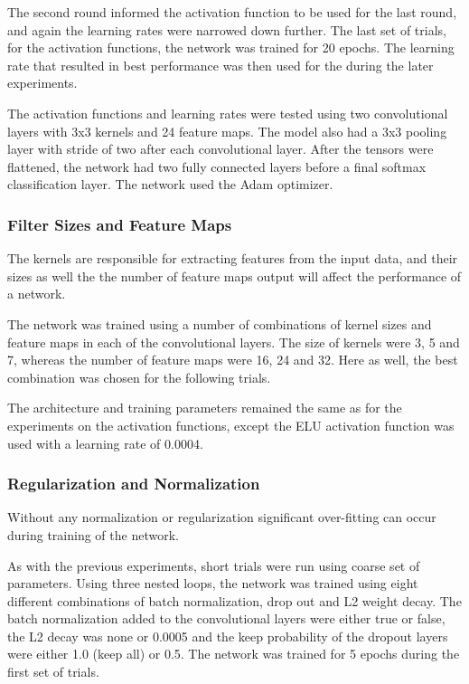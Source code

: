 \documentclass[]{article}
\begin{document}
The second round informed the activation function to be used for the last round, and again the learning rates were narrowed down further. The last set of trials, for the activation functions, the network was trained for 20 epochs. The learning rate that resulted in best performance was then used for the during the later experiments. 

The activation functions and learning rates were tested using two convolutional layers with 3x3 kernels and 24 feature maps. The model also had a 3x3 pooling layer with stride of two after each convolutional layer. After the tensors were flattened, the network had two fully connected layers before a final softmax classification layer. The network used the Adam optimizer. 

\subsubsection{Filter Sizes and Feature Maps}

The kernels are responsible for extracting features from the input data, and their sizes as well the the number of feature maps output will affect the performance of a network. 

The network was trained using a number of combinations of kernel sizes and feature maps in each of the convolutional layers. The size of kernels were 3, 5 and 7, whereas the number of feature maps were 16, 24 and 32. Here as well, the best combination was chosen for the following trials.

The architecture and training parameters remained the same as for the experiments on the activation functions, except the ELU activation function was used with a learning rate of 0.0004. 

\subsubsection{Regularization and Normalization}

Without any normalization or regularization significant over-fitting can occur during training of the network. 

As with the previous experiments, short trials were run using coarse set of parameters. Using three nested loops, the network was trained using eight different combinations of batch normalization, drop out and L2 weight decay. The batch normalization added to the convolutional layers were either true or false, the L2 decay was none or 0.0005 and the keep probability of the dropout layers were either 1.0 (keep all) or 0.5. The network was trained for 5 epochs during the first set of trials. 
\end{document}
